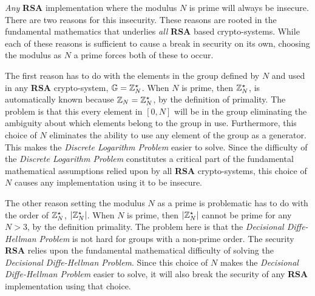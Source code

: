 \documentclass[../CryptoHW3.tex]{subfiles}
\begin{document}
\begin{flushleft}



  \emph{Any} \textbf{RSA} implementation where the modulus $N$ is prime will always be insecure.  There are two reasons for this insecurity.  These reasons are rooted in the fundamental mathematics that underlies \emph{all} \textbf{RSA} based crypto-systems.  While each of these reasons is sufficient to cause a break in security on its own, choosing the modulus as $N$ a prime forces both of these to occur. \newline

The first reason has to do with the elements in the group defined by $N$ and used in any \textbf{RSA} crypto-system, $\mathbb{G} = \mathbb{Z}_N^\star$.  When $N$ is prime, then $\mathbb{Z}_N^\star$, is automatically known because $\mathbb{Z}_N = \mathbb{Z}_N^\star$, by the definition of primality. The problem is that this every element in $\left[ 0, N \right]$ will be in the group eliminating the ambiguity about which elements belong to the group in use.  Furthermore, this choice of $N$ eliminates the ability to use any element of the group as a generator.  This makes the \emph{Discrete Logarithm Problem} easier to solve.  Since the difficulty of the \emph{Discrete Logarithm Problem} constitutes a critical part of the fundamental mathematical assumptions relied upon by all \textbf{RSA} crypto-systems, this choice of $N$ causes any implementation using it to be insecure. \newline

The other reason setting the modulus $N$ as a prime is problematic has to do with the order of $\mathbb{Z}_N^\star$, $\left| \mathbb{Z}_N^\star \right|$.  When $N$ is prime, then $\left| \mathbb{Z}_N^\star \right|$ cannot be prime for any $N > 3$, by the definition primality.  The problem here is that the \emph{Decisional Diffe-Hellman Problem} is not hard for groups with a non-prime order.  The security \textbf{RSA} relies upon the fundamental mathematical difficulty of solving the \emph{Decisional Diffe-Hellman Problem}.  Since this choice of $N$ makes the \emph{Decisional Diffe-Hellman Problem} easier to solve, it will also break the security of any \textbf{RSA} implementation using that choice.



\end{flushleft}
\end{document}
